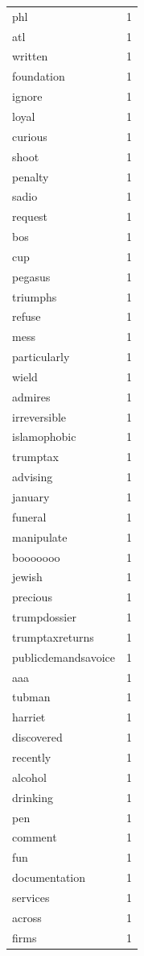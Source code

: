 \begin{tabular}{lr}
phl & 1 \\
atl & 1 \\
written & 1 \\
foundation & 1 \\
ignore & 1 \\
loyal & 1 \\
curious & 1 \\
shoot & 1 \\
penalty & 1 \\
sadio & 1 \\
request & 1 \\
bos & 1 \\
cup & 1 \\
pegasus & 1 \\
triumphs & 1 \\
refuse & 1 \\
mess & 1 \\
particularly & 1 \\
wield & 1 \\
admires & 1 \\
irreversible & 1 \\
islamophobic & 1 \\
trumptax & 1 \\
advising & 1 \\
january & 1 \\
funeral & 1 \\
manipulate & 1 \\
booooooo & 1 \\
jewish & 1 \\
precious & 1 \\
trumpdossier & 1 \\
trumptaxreturns & 1 \\
publicdemandsavoice & 1 \\
aaa & 1 \\
tubman & 1 \\
harriet & 1 \\
discovered & 1 \\
recently & 1 \\
alcohol & 1 \\
drinking & 1 \\
pen & 1 \\
comment & 1 \\
fun & 1 \\
documentation & 1 \\
services & 1 \\
across & 1 \\
firms & 1 \\

\end{tabular}

